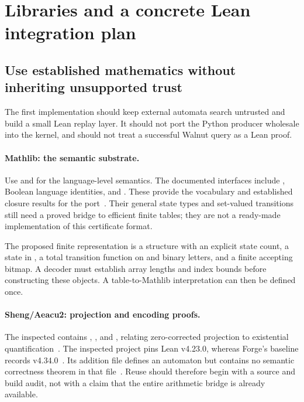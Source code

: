 \section{Libraries and a concrete Lean integration plan}\label{sec:lean}

\subsection{Use established mathematics without inheriting unsupported trust}
The first implementation should keep external automata search untrusted and build a small Lean replay layer. It should not port the Python producer wholesale into the kernel, and should not treat a successful Walnut query as a Lean proof.

\paragraph{Mathlib: the semantic substrate.}
Use  and  for the language-level semantics. The documented interfaces include , Boolean language identities, and . These provide the vocabulary and established closure results for the port~\cite{mathlib-dfa,mathlib-nfa}. Their general state types and set-valued transitions still need a proved bridge to efficient finite tables; they are not a ready-made implementation of this certificate format.

The proposed finite representation is a structure with an explicit state count, a state in , a total transition function on  and binary letters, and a finite accepting bitmap. A decoder must establish array lengths and index bounds before constructing these objects. A table-to-Mathlib interpretation can then be defined once.

\paragraph{Sheng/Aeacu2: projection and encoding proofs.}
The inspected  contains , , and , relating zero-corrected projection to existential quantification~\cite{aeacu-projection}. The inspected project pins Lean v4.23.0, whereas Forge's baseline records v4.34.0~\cite{aeacu-toolchain,forge-readme}. Its addition file defines an automaton but contains no semantic correctness theorem in that file~\cite{aeacu-addition}. Reuse should therefore begin with a source and build audit, not with a claim that the entire arithmetic bridge is already available.

